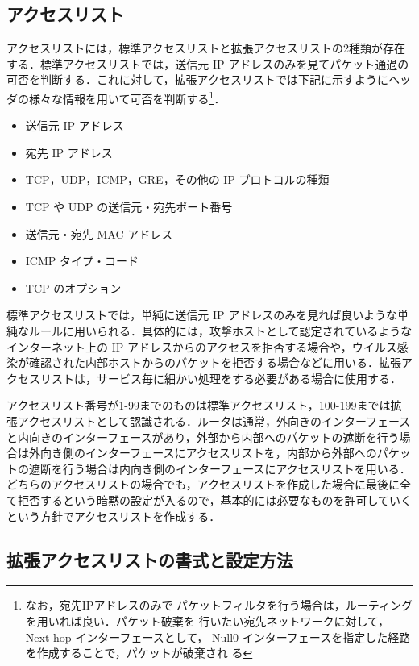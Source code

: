 \subsection*{アクセスリスト}
アクセスリストには，標準アクセスリストと拡張アクセスリストの2種類が存在
する．標準アクセスリストでは，送信元 IP アドレスのみを見てパケット通過の
可否を判断する．これに対して，拡張アクセスリストでは下記に示すようにヘッ
ダの様々な情報を用いて可否を判断する\footnote{なお，宛先IPアドレスのみで
パケットフィルタを行う場合は，ルーティングを用いれば良い．パケット破棄を
行いたい宛先ネットワークに対して，Next hop インターフェースとして， 
Null0 インターフェースを指定した経路を作成することで，パケットが破棄され
る}．
\begin{itemize}
 \item 送信元 IP アドレス
 \item 宛先 IP アドレス
 \item TCP，UDP，ICMP，GRE，その他の IP プロトコルの種類
 \item TCP や UDP の送信元・宛先ポート番号
 \item 送信元・宛先 MAC アドレス
 \item ICMP タイプ・コード
 \item TCP のオプション
\end{itemize}

標準アクセスリストでは，単純に送信元 IP アドレスのみを見れば良いような単
純なルールに用いられる．具体的には，攻撃ホストとして認定されているような
インターネット上の IP アドレスからのアクセスを拒否する場合や，ウイルス感
染が確認された内部ホストからのパケットを拒否する場合などに用いる．拡張ア
クセスリストは，サービス毎に細かい処理をする必要がある場合に使用する．

アクセスリスト番号が1-99までのものは標準アクセスリスト，100-199までは拡
張アクセスリストとして認識される．ルータは通常，外向きのインターフェース
と内向きのインターフェースがあり，外部から内部へのパケットの遮断を行う場
合は外向き側のインターフェースにアクセスリストを，内部から外部へのパケッ
トの遮断を行う場合は内向き側のインターフェースにアクセスリストを用いる．
どちらのアクセスリストの場合でも，アクセスリストを作成した場合に最後に全
て拒否するという暗黙の設定が入るので，基本的には必要なものを許可していく
という方針でアクセスリストを作成する．

\subsection*{拡張アクセスリストの書式と設定方法}

